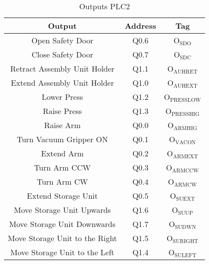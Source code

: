 \begin{table}[htbp]
\caption{Outputs PLC2}
\centering
\begin{tabular}{c|c|c}
Output & Address & Tag\\
\hline
Open Safety Door & Q0.6 & O\(_{\text{SDO}}\)\\
Close Safety Door & Q0.7 & O\(_{\text{SDC}}\)\\
Retract Assembly Unit Holder & Q1.1 & O\(_{\text{AUHRET}}\)\\
Extend Assembly Unit Holder & Q1.0 & O\(_{\text{AUHEXT}}\)\\
Lower Press & Q1.2 & O\(_{\text{PRESSLOW}}\)\\
Raise Press & Q1.3 & O\(_{\text{PRESSHIG}}\)\\
Raise Arm & Q0.0 & O\(_{\text{ARMHIG}}\)\\
Turn Vacuum Gripper ON & Q0.1 & O\(_{\text{VACON}}\)\\
Extend Arm & Q0.2 & O\(_{\text{ARMEXT}}\)\\
Turn Arm CCW & Q0.3 & O\(_{\text{ARMCCW}}\)\\
Turn Arm CW & Q0.4 & O\(_{\text{ARMCW}}\)\\
Extend Storage Unit & Q0.5 & O\(_{\text{SUEXT}}\)\\
Move Storage Unit Upwards & Q1.6 & O\(_{\text{SUUP}}\)\\
Move Storage Unit Downwards & Q1.7 & O\(_{\text{SUDWN}}\)\\
Move Storage Unit to the Right & Q1.5 & O\(_{\text{SURIGHT}}\)\\
Move Storage Unit to the Left & Q1.4 & O\(_{\text{SULEFT}}\)\\
\end{tabular}
\end{table}
